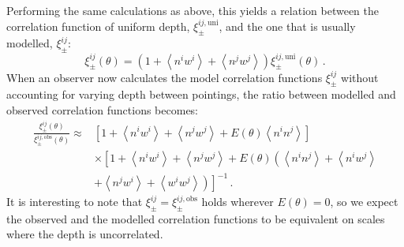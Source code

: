 \documentclass{aa}
\renewcommand{\rm}{\mathrm}
\def\inv{^{-1}}
\def\la{\left<}
\def\ra{\right>}
\begin{document}
 Performing the same calculations as above, this yields a relation between the correlation function of uniform depth, $\xi_\pm^{ij,\rm{uni}}$, and the one that is usually modelled, $\xi_\pm^{ij}$:
\begin{equation}
\xi_\pm^{ij}(\theta) = \left(1+\la n^iw^i\ra + \la n^jw^j\ra \right)\xi_\pm^{ij,\rm{uni}}(\theta)\, .
\end{equation}
When an observer now calculates the model correlation functions $\xi^{ij}_\pm$ without accounting for varying depth between pointings, the ratio between modelled and observed correlation functions becomes: \begin{align}
\frac{\xi^{ij}_\pm(\theta)}{\xi_\pm^{ij,\rm{obs}}(\theta)} \approx &  \left[1+\la n^iw^i\ra +\la n^jw^j\ra + E(\theta)\la n^in^j\ra\right] \nonumber\\
& \times \left[1 + \la n^iw^i\ra + \la n^jw^j\ra + E(\theta)\left(\la n^in^j\ra + \la n^iw^j\ra \right.\right. \nonumber\\
& \left.\left. + \la n^j w^i\ra + \la w^iw^j\ra\right)\right]\inv
\, .
\end{align}
It is interesting to note that $\xi^{ij}_\pm = \xi_\pm^{ij,\rm{obs}}$ holds wherever $E(\theta)=0$, so we expect the observed and the modelled correlation functions to be equivalent on scales where the depth is uncorrelated. 


\end{document}
